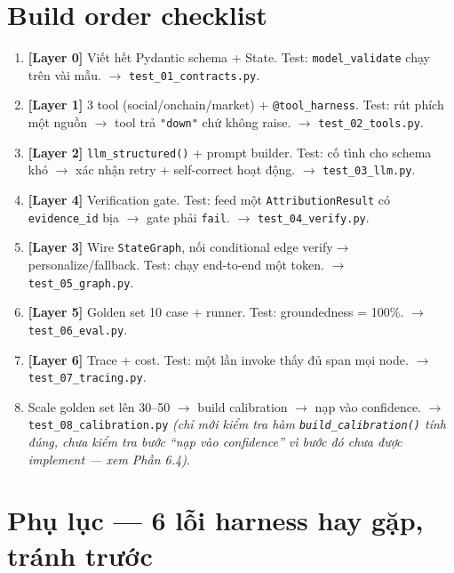 \documentclass[12pt,a4paper]{article}
\newcommand{\file}[1]{\texttt{#1}}
\begin{document}
\section{Build order checklist}

\begin{enumerate}[leftmargin=1.8em]
    \item \textbf{[Layer 0]} Viết hết Pydantic schema + State. Test: \texttt{model\_validate}
    chạy trên vài mẫu. $\to$ \file{test\_01\_contracts.py}.
    \item \textbf{[Layer 1]} 3 tool (social/onchain/market) + \texttt{@tool\_harness}. Test: rút
    phích một nguồn $\to$ tool trả \texttt{"down"} chứ không raise. $\to$
    \file{test\_02\_tools.py}.
    \item \textbf{[Layer 2]} \texttt{llm\_structured()} + prompt builder. Test: cố tình cho schema
    khó $\to$ xác nhận retry + self-correct hoạt động. $\to$ \file{test\_03\_llm.py}.
    \item \textbf{[Layer 4]} Verification gate. Test: feed một \texttt{AttributionResult} có
    \texttt{evidence\_id} bịa $\to$ gate phải \texttt{fail}. $\to$ \file{test\_04\_verify.py}.
    \item \textbf{[Layer 3]} Wire \texttt{StateGraph}, nối conditional edge
    verify$\to$personalize/fallback. Test: chạy end-to-end một token. $\to$
    \file{test\_05\_graph.py}.
    \item \textbf{[Layer 5]} Golden set 10 case + runner. Test: groundedness = 100\%. $\to$
    \file{test\_06\_eval.py}.
    \item \textbf{[Layer 6]} Trace + cost. Test: một lần invoke thấy đủ span mọi node. $\to$
    \file{test\_07\_tracing.py}.
    \item Scale golden set lên 30--50 $\to$ build calibration $\to$ nạp vào confidence. $\to$
    \file{test\_08\_calibration.py} \emph{(chỉ mới kiểm tra hàm \texttt{build\_calibration()} tính
    đúng, chưa kiểm tra bước ``nạp vào confidence'' vì bước đó chưa được implement --- xem Phần
    6.4)}.
\end{enumerate}

\section{Phụ lục --- 6 lỗi harness hay gặp, tránh trước}
\end{document}
